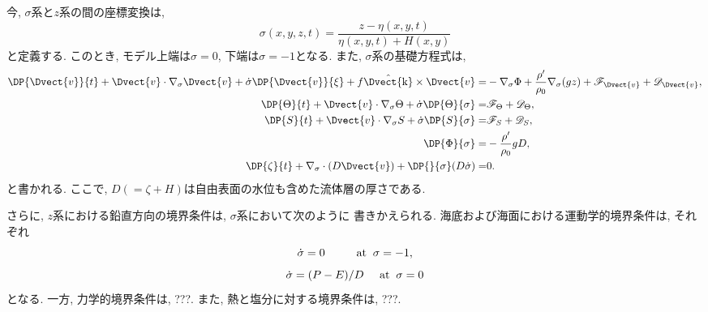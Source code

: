 \documentclass[a4j,12pt,openbib,oneside]{jreport}
\def\univec#1{ \hat{ \Dvect{\rm #1}} }
\begin{document}
今, $\sigma$系と$z$系の間の座標変換は, 
\begin{equation}
 \sigma(x,y,z,t) =　\dfrac{z - \eta(x,y,t)}{\eta(x,y,t) + H(x,y)} 
\end{equation}
と定義する. 
このとき, モデル上端は$\sigma=0$, 下端は$\sigma=-1$となる. 
また, $\sigma$系の基礎方程式は, 
\begin{align}
  \DP{\Dvect{v}}{t} + \Dvect{v} \cdot \nabla_\sigma \Dvect{v} + \dot{\sigma} \DP{\Dvect{v}}{\xi} + f \univec{k} \times \Dvect{v} 
 =& - \nabla_\sigma \Phi + \dfrac{\rho'}{\rho_0} \nabla_\sigma (gz) 
  + \mathscr{F}_{\Dvect{v}} + \mathscr{D}_{\Dvect{v}}, \label{hmotion_Eq_SigCoord} \\
   \DP{\Theta}{t} + \Dvect{v}\cdot\nabla_\sigma\Theta + \dot{\sigma} \DP{\Theta}{\sigma} 
 =& \mathscr{F}_\Theta + \mathscr{D}_\Theta, \label{ptemp_Eq_SigCoord} \\
   \DP{S}{t} + \Dvect{v}\cdot\nabla_\sigma S + \dot{\sigma}\DP{S}{\sigma} 
 =& \mathscr{F}_S + \mathscr{D}_S, \label{salt_Eq_SigCoord} \\
  \DP{\Phi}{\sigma} =& - \dfrac{\rho'}{\rho_0} gD, \label{hydrostatic_Eq_SigCoord} \\
  \DP{\zeta}{t} + \nabla_\sigma \cdot (D \Dvect{v}) + \DP{}{\sigma}(D \dot{\sigma}) =& 0 \label{continious_Eq_SigCoord}. 
\end{align}
と書かれる. 
ここで, $D(=\zeta+H)$は自由表面の水位も含めた流体層の厚さである. 

さらに, $z$系における鉛直方向の境界条件は, $\sigma$系において次のように
書きかえられる. 
海底および海面における運動学的境界条件は, 
それぞれ
\begin{equation}
 \dot{\sigma} = 0 \;\;\;\;\;\;\;\;\;\; {\rm at} \;\; \sigma=-1,
\end{equation}
\begin{equation}
 \dot{\sigma} = (P-E)/D \;\;\;\;\;     {\rm at} \;\; \sigma=0
\end{equation}
となる. 
一方, 力学的境界条件は, ???.
また, 熱と塩分に対する境界条件は, ???.

%
\end{document}
